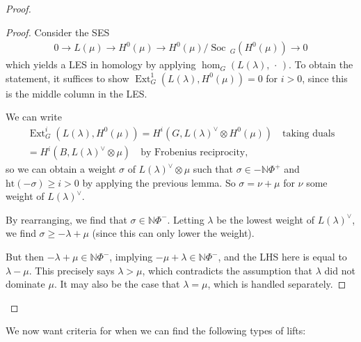 \begin{proof}

\begin{proof}

Consider the SES
\begin{align*}   0 \to L(\mu) \to H^0(\mu) \to H^0(\mu) / \operatorname{Soc}\,_G(H^0(\mu)) \to 0 \end{align*}
which yields a LES in homology by applying
\(\hom_G(L(\lambda), {\,\cdot\,})\). To obtain the statement, it
suffices to show \(\operatorname{Ext}_G^1(L(\lambda), H^0(\mu)) = 0\)
for \(i>0\), since this is the middle column in the LES.

We can write
\begin{align*}   \operatorname{Ext}_G^i(L(\lambda), H^0(\mu)) = H^i(G, L(\lambda)^\vee\otimes H^0(\mu)) \quad\text{taking duals} \\ = H^i(B, L(\lambda)^\vee\otimes\mu) \quad\text{by Frobenius reciprocity} ,\end{align*}
so we can obtain a weight \(\sigma\) of \(L(\lambda)^\vee\otimes\mu\)
such that \(\sigma \in - {\mathbb{N}}\Phi^+\) and
\(\text{ht}(-\sigma) \geq i > 0\) by applying the previous lemma. So
\(\sigma = \nu + \mu\) for \(\nu\) some weight of \(L(\lambda)^\vee\).

By rearranging, we find that \(\sigma \in {\mathbb{N}}\Phi^-\). Letting
\(\lambda\) be the lowest weight of \(L(\lambda)^\vee\), we find
\(\sigma \geq -\lambda + \mu\) (since this can only lower the weight).

But then \(-\lambda + \mu \in {\mathbb{N}}\Phi^-\), implying
\(-\mu + \lambda \in {\mathbb{N}}\Phi^-\), and the LHS here is equal to
\(\lambda - \mu\). This precisely says \(\lambda > \mu\), which
contradicts the assumption that \(\lambda\) did not dominate \(\mu\). It
may also be the case that \(\lambda = \mu\), which is handled
separately.

\end{proof}

\end{proof}

We now want criteria for when we can find the following types of lifts:

\begin{center}
\end{center}

